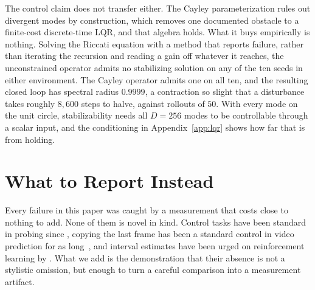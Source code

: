 \documentclass[10pt]{article} %
\begin{document}
The control claim does not transfer either. The Cayley parameterization rules out divergent modes by construction, which removes one documented obstacle to a finite-cost discrete-time LQR, and that algebra holds. What it buys empirically is nothing. Solving the Riccati equation with a method that reports failure, rather than iterating the recursion and reading a gain off whatever it reaches, the unconstrained operator admits no stabilizing solution on any of the ten seeds in either environment. The Cayley operator admits one on all ten, and the resulting closed loop has spectral radius $0.9999$, a contraction so slight that a disturbance takes roughly $8{,}600$ steps to halve, against rollouts of $50$. With every mode on the unit circle, stabilizability needs all $D{=}256$ modes to be controllable through a scalar input, and the conditioning in Appendix~\ref{app:lqr} shows how far that is from holding.

\section{What to Report Instead}
\label{sec:checklist}
Every failure in this paper was caught by a measurement that costs close to nothing to add. None of them is novel in kind. Control tasks have been standard in probing since \citet{Hewitt2019ControlTasks}, copying the last frame has been a standard control in video prediction for as long~\citep{Villegas2017MCnet,Villegas2019HighFidelity}, and interval estimates have been urged on reinforcement learning by \citet{Agarwal2021Precipice}. What we add is the demonstration that their absence is not a stylistic omission, but enough to turn a careful comparison into a measurement artifact.
\end{document}

